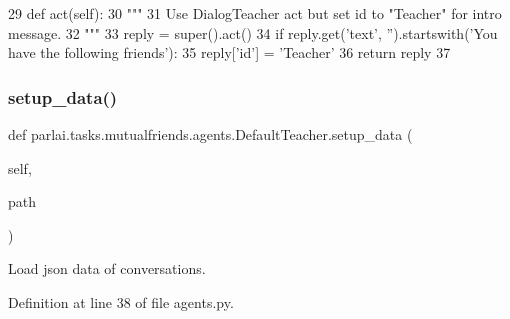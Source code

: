 \begin{DoxyCode}
29     \textcolor{keyword}{def }act(self):
30         \textcolor{stringliteral}{"""}
31 \textcolor{stringliteral}{        Use DialogTeacher act but set id to "Teacher" for intro message.}
32 \textcolor{stringliteral}{        """}
33         reply = super().act()
34         \textcolor{keywordflow}{if} reply.get(\textcolor{stringliteral}{'text'}, \textcolor{stringliteral}{''}).startswith(\textcolor{stringliteral}{'You have the following friends'}):
35             reply[\textcolor{stringliteral}{'id'}] = \textcolor{stringliteral}{'Teacher'}
36         \textcolor{keywordflow}{return} reply
37 
\end{DoxyCode}
\mbox{\label{classparlai_1_1tasks_1_1mutualfriends_1_1agents_1_1DefaultTeacher_ad707ea05ad7771936549775dbb776d59}} 
\subsubsection{\texorpdfstring{setup\+\_\+data()}{setup\_data()}}
{\footnotesize\ttfamily def parlai.\+tasks.\+mutualfriends.\+agents.\+Default\+Teacher.\+setup\+\_\+data (\begin{DoxyParamCaption}\item[{}]{self,  }\item[{}]{path }\end{DoxyParamCaption})}

\begin{DoxyVerb}Load json data of conversations.
\end{DoxyVerb}
 

Definition at line 38 of file agents.\+py.


